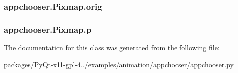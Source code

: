 \subsubsection[{orig}]{\setlength{\rightskip}{0pt plus 5cm}appchooser.\+Pixmap.\+orig}\label{classappchooser_1_1Pixmap_a01b697e17945b980d79ba12256fecf80}
\hypertarget{classappchooser_1_1Pixmap_ae22103fc2e83348f7b4f34818931e74f}{}
\subsubsection[{p}]{\setlength{\rightskip}{0pt plus 5cm}appchooser.\+Pixmap.\+p}\label{classappchooser_1_1Pixmap_ae22103fc2e83348f7b4f34818931e74f}


The documentation for this class was generated from the following file\+:\begin{DoxyCompactItemize}
\item 
packages/\+Py\+Qt-\/x11-\/gpl-\/4../examples/animation/appchooser/\hyperlink{appchooser_8py}{appchooser.\+py}\end{DoxyCompactItemize}
